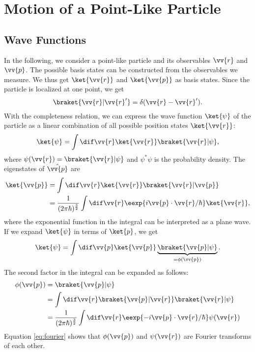 	\section{Motion of a Point-Like Particle}
		\subsection{Wave Functions}
			In the following, we consider a point-like particle and its observables $\vv{r}$ and $\vv{p}$. The possible basis states can be constructed from the observables we measure. We thus get $\ket{\vv{r}}$ and $\ket{\vv{p}}$ as basis states. Since the particle is localized at one point, we get
			\begin{align}
				\braket{\vv{r}|\vv{r}'} =\delta(\vv{r}-\vv{r}').
			\end{align}
			With the completeness relation, we can express the wave function $\ket{\psi}$ of the particle as a linear combination of all possible position states $\ket{\vv{r}}$:
			\begin{align}
				\ket{\psi}=\int \dif \vv{r} \ket{\vv{r}}\braket{\vv{r}|\psi},
			\end{align}
			where $\psi(\vv{r})=\braket{\vv{r}|\psi}$ and $\psi^*\psi$ is the probability density.
			The eigenstates of $\hat{\vv{p}}$ are
			\begin{align}
				\ket{\vv{p}}&=\int \dif \vv{r} \ket{\vv{r}} \braket{\vv{r}|\vv{p}} \\
				&= \frac{1}{(2\pi\hbar)^{\frac{3}{2}}} \int \dif \vv{r} \eexp{{i \vv{p}\cdot\vv{r}}/{\hbar}}\ket{\vv{r}},
			\end{align}
			where the exponential function in the integral can be interpreted as a plane wave.
			If we expand $\ket{\psi}$ in terms of $\ket{p}$, we get
			\begin{align}
				\ket{\psi}=\int \dif \vv{p} \ket{\vv{p}}\underbrace{\braket{\vv{p}|\psi}}_{=\phi(\vv{p})}.
			\end{align}
			The second factor in the integral can be expanded as follows:
			\begin{align}
				\phi(\vv{p})	&=\braket{\vv{p}|\psi}\\
				&=\int\dif\vv{r}\braket{\vv{p}|\vv{r}}\braket{\vv{r}|\psi}\\
				&=\frac{1}{(2\pi\hbar)^{\frac{3}{2}}} \int\dif\vv{r}\eexp{-i\vv{p}\cdot\vv{r}/{\hbar}}\psi(\vv{r}) \label{eq:fourier}
			\end{align}
			Equation \eqref{eq:fourier} shows that $\phi(\vv{p})$ and $\psi(\vv{r})$ are Fourier transforms of each other.

